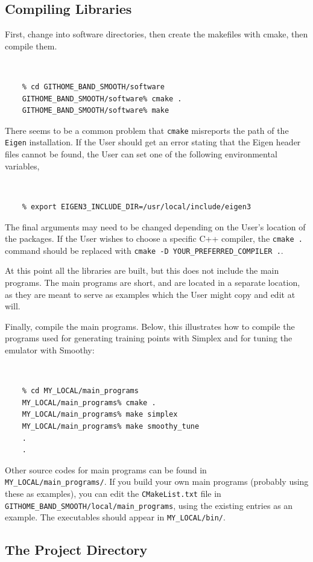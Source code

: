 \documentclass[UserManual.tex]{subfiles}
\begin{document}
\subsection{Compiling Libraries }

First, change into software directories, then create the makefiles with cmake, then compile them.
{\tt 
\begin{verbatim}
    % cd GITHOME_BAND_SMOOTH/software
    GITHOME_BAND_SMOOTH/software% cmake .
    GITHOME_BAND_SMOOTH/software% make
\end{verbatim}
}
There seems to be a common problem that {\tt cmake} misreports the path of the {\tt Eigen} installation. If the User should get an error stating that the Eigen header files cannot be found, the User can set one of the following environmental variables,
{\tt 
\begin{verbatim}
    % export EIGEN3_INCLUDE_DIR=/usr/local/include/eigen3
\end{verbatim}
}
The final arguments may need to be changed depending on the User's location of the packages. If the User wishes to choose a specific C++ compiler, the {\tt cmake .} command should be replaced with {\tt cmake -D YOUR_PREFERRED_COMPILER .}. 

At this point all the libraries are built, but this does not include the main programs. The main programs are short, and are located in a separate location, as they are meant to serve as examples which the User might copy and edit at will.

Finally, compile the main programs. Below, this illustrates how to compile the programs used for generating training points with Simplex and for tuning the emulator with Smoothy:
{\tt
\begin{verbatim}
    % cd MY_LOCAL/main_programs
    MY_LOCAL/main_programs% cmake .
    MY_LOCAL/main_programs% make simplex
    MY_LOCAL/main_programs% make smoothy_tune
    .
    .
\end{verbatim}
}
Other source codes for main programs can be found in {\tt MY\_LOCAL/main\_programs/}. If you build your own main programs (probably using these as examples), you can edit the {\tt CMakeList.txt} file in {\tt GITHOME\_BAND\_SMOOTH/local/main\_programs}, using the existing entries as an example. The executables should appear in {\tt MY\_LOCAL/bin/}. 

\subsection{The Project Directory}
\end{document}
